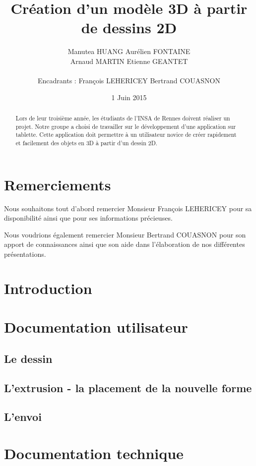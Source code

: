 \documentclass[a4paper,11pt]{article}
\title{ \textbf{Création d'un modèle 3D à partir de dessins 2D} }
\author{ Manutea \textsc{HUANG} Aurélien \textsc{FONTAINE} \\
	Arnaud \textsc{MARTIN} Etienne \textsc{GEANTET} \\
	\\
	Encadrants : François \textsc{LEHERICEY}	Bertrand \textsc{COUASNON}}
\date{1 Juin 2015}                    %
\begin{document}
\maketitle                 %
\thispagestyle{empty}      %

\begin{abstract}
	Lors de leur troisième année, les étudiants de l'INSA de Rennes doivent réaliser un projet. Notre groupe a choisi de travailler sur le développement d'une application sur tablette. Cette application doit permettre à un utilisateur novice de créer rapidement et facilement des objets en 3D à partir d'un dessin 2D. 
\end{abstract}
	
	\section{Remerciements}
		Nous souhaitons tout d'abord remercier Monsieur François LEHERICEY pour sa disponibilité ainsi que pour ses informations précieuses.
		
		Nous voudrions également remercier Monsieur Bertrand COUASNON pour son apport de connaissances ainsi que son aide dans l'élaboration de nos différentes présentations.
				
	\section{Introduction}
	\section{Documentation utilisateur}
		\subsection{Le dessin}
		\subsection{L'extrusion - la placement de la nouvelle forme}
		\subsection{L'envoi}
			
	\section{Documentation technique}
	
\end{document}
